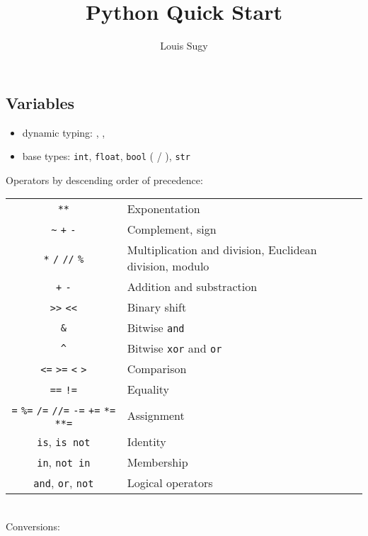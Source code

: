 \documentclass[twocolumn]{article}
\title{Python Quick Start}
\author{Louis Sugy}
\date{}
\providecommand{\tightlist}{%
  \setlength{\itemsep}{0pt}\setlength{\parskip}{0pt}}
\begin{document}
\maketitle

\subsection{Variables}\label{variables}

\begin{itemize}
\tightlist
\item
  dynamic typing: , , 
\item
  base types: \texttt{int}, \texttt{float}, \texttt{bool} ( / ), \texttt{str}
\end{itemize}

Operators by descending order of precedence:

\begin{tabular}{|c|p{4cm}|}
\hline
\texttt{**} & Exponentation \\
\texttt{\textasciitilde{}} \texttt{+} \texttt{-} & Complement, sign \\
\texttt{*} \texttt{/} \texttt{//} \texttt{\%} & Multiplication and division, Euclidean division, modulo \\
\texttt{+} \texttt{-} & Addition and substraction \\
\texttt{\textgreater{}\textgreater{}} \texttt{\textless{}\textless{}} & Binary shift \\
\texttt{\&} & Bitwise \texttt{and} \\
\texttt{\^{}} \textbar{} & Bitwise \texttt{xor} and \texttt{or} \\
\texttt{\textless{}=} \texttt{\textgreater{}=} \texttt{\textless{}} \texttt{\textgreater{}} & Comparison \\
\texttt{==} \texttt{!=} & Equality \\
\texttt{=} \texttt{\%=} \texttt{/=} \texttt{//=} \texttt{-=} \texttt{+=} \texttt{*=} \texttt{**=} & Assignment \\
\texttt{is}, \texttt{is\ not} & Identity \\
\texttt{in}, \texttt{not\ in} & Membership \\
\texttt{and}, \texttt{or}, \texttt{not} & Logical operators \\ \hline
\end{tabular}\\

Conversions:
\end{document}
